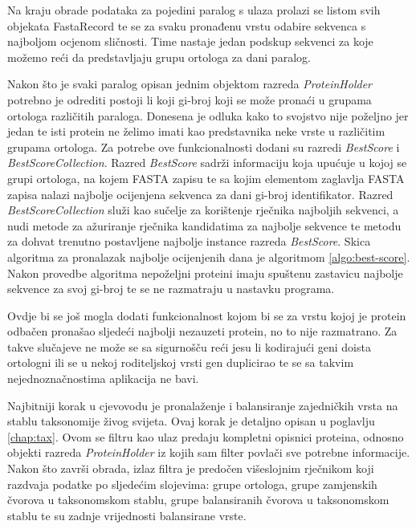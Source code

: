 Na kraju obrade podataka za pojedini paralog s ulaza prolazi se listom svih
objekata FastaRecord te se za svaku pronađenu vrstu odabire sekvenca s najboljom
ocjenom sličnosti. Time nastaje jedan podskup sekvenci za koje možemo reći da
predstavljaju grupu ortologa za dani paralog.

Nakon što je svaki paralog opisan jednim objektom razreda \emph{ProteinHolder}
potrebno je odrediti postoji li koji gi-broj koji se može pronaći u grupama
ortologa različitih paraloga. Donesena je odluka kako to svojstvo nije poželjno
jer jedan te isti protein ne želimo imati kao predstavnika neke vrste u
različitim grupama ortologa. Za potrebe ove funkcionalnosti dodani su razredi
\emph{BestScore} i \emph{BestScoreCollection}. Razred \emph{BestScore} sadrži
informaciju koja upućuje u kojoj se grupi ortologa, na kojem FASTA zapisu te sa
kojim elementom zaglavlja FASTA zapisa nalazi najbolje ocijenjena sekvenca za
dani gi-broj identifikator. Razred \emph{BestScoreCollection} služi kao sučelje
za korištenje rječnika najboljih sekvenci, a nudi metode za ažuriranje rječnika
kandidatima za najbolje sekvence te metodu za dohvat trenutno postavljene
najbolje instance razreda \emph{BestScore}. Skica algoritma za pronalazak
najbolje ocijenjenih dana je algoritmom \ref{algo:best-score}. Nakon provedbe
algoritma nepoželjni proteini imaju spuštenu zastavicu najbolje sekvence za svoj
gi-broj te se ne razmatraju u nastavku programa.



Ovdje bi se još mogla dodati funkcionalnost kojom bi se za vrstu kojoj je
protein odbačen pronašao sljedeći najbolji nezauzeti protein, no to nije
razmatrano. Za takve slučajeve ne može se sa sigurnošču reći jesu li kodirajući
geni doista ortologni ili se u nekoj roditeljskoj vrsti gen duplicirao te se sa
takvim nejednoznačnostima aplikacija ne bavi.

Najbitniji korak u cjevovodu je pronalaženje i balansiranje zajedničkih vrsta na
stablu taksonomije živog svijeta. Ovaj korak je detaljno opisan u poglavlju
\ref{chap:tax}. Ovom se filtru kao ulaz predaju kompletni opisnici proteina,
odnosno objekti razreda \emph{ProteinHolder} iz kojih sam filter povlači sve
potrebne informacije. Nakon što završi obrada, izlaz filtra je predočen
višeslojnim rječnikom koji razdvaja podatke po sljedećim slojevima: grupe
ortologa, grupe zamjenskih čvorova u taksonomskom stablu, grupe balansiranih
čvorova u taksonomskom stablu te su zadnje vrijednosti balansirane vrste.

